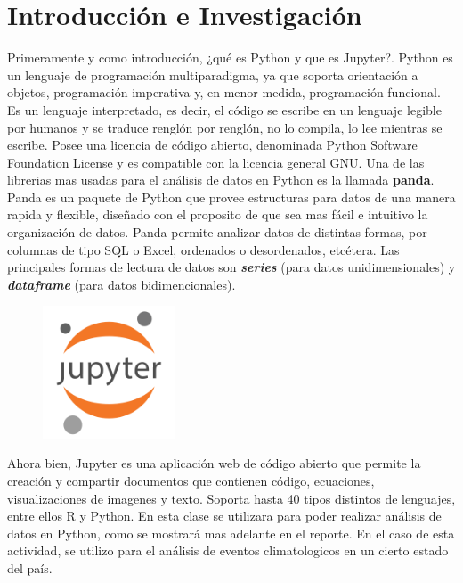 \documentclass[12pt]{article}
\begin{document}
\section{Introducción e Investigación}
Primeramente y como introducción, ¿qué es Python y que es Jupyter?. Python es un lenguaje de programación multiparadigma, ya que soporta orientación a objetos, programación imperativa y, en menor medida, programación funcional. Es un lenguaje interpretado, es decir, el código se escribe en un lenguaje legible por humanos y se traduce renglón por renglón, no lo compila, lo lee mientras se escribe. Posee una licencia de código abierto, denominada Python Software Foundation License y es compatible con la licencia general GNU. Una de las librerias mas usadas para el análisis de datos en Python es la llamada \textbf{panda}. Panda es un paquete de Python que provee estructuras para datos de una manera rapida y flexible, diseñado con el proposito de que sea mas fácil e intuitivo la organización de datos. Panda permite analizar datos de distintas formas, por columnas de tipo SQL o Excel, ordenados o desordenados, etcétera. Las principales formas de lectura de datos son \textbf{\textit{series}} (para datos unidimensionales) y \textbf{\textit{dataframe}} (para datos bidimencionales). \\

\begin{figure}
    \centering
    \includegraphics[width=0.35\textwidth]{LogoJ.png}
\end{figure}

Ahora bien, Jupyter es una aplicación web de código abierto que permite la creación y compartir documentos que contienen código, ecuaciones, visualizaciones de imagenes y texto. Soporta hasta 40 tipos distintos de lenguajes, entre ellos R y Python. En esta clase se utilizara para poder realizar análisis de datos en Python, como se mostrará mas adelante en el reporte. En el caso de esta actividad, se utilizo para el análisis de eventos climatologicos en un cierto estado del país. \\\\\\
\end{document}
